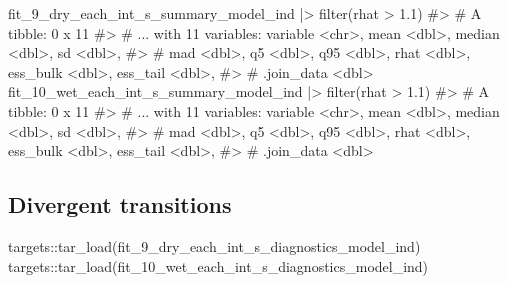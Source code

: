 \documentclass[
  11pt,
  letterpaper,
  DIV=11,
  numbers=noendperiod]{scrartcl}
\newenvironment{Shaded}{}{}
\newcommand{\CommentTok}[1]{\textcolor[rgb]{0.42,0.45,0.49}{#1}}
\newcommand{\FloatTok}[1]{\textcolor[rgb]{0.00,0.36,0.77}{#1}}
\newcommand{\FunctionTok}[1]{\textcolor[rgb]{0.44,0.26,0.76}{#1}}
\newcommand{\NormalTok}[1]{\textcolor[rgb]{0.14,0.16,0.18}{#1}}
\newcommand{\SpecialCharTok}[1]{\textcolor[rgb]{0.00,0.36,0.77}{#1}}
\begin{document}
\begin{Shaded}
\begin{Highlighting}[]
\NormalTok{fit\_9\_dry\_each\_int\_s\_summary\_model\_ind }\SpecialCharTok{|\textgreater{}} \FunctionTok{filter}\NormalTok{(rhat }\SpecialCharTok{\textgreater{}} \FloatTok{1.1}\NormalTok{)}
\CommentTok{\#\textgreater{} \# A tibble: 0 x 11}
\CommentTok{\#\textgreater{} \# ... with 11 variables: variable \textless{}chr\textgreater{}, mean \textless{}dbl\textgreater{}, median \textless{}dbl\textgreater{}, sd \textless{}dbl\textgreater{},}
\CommentTok{\#\textgreater{} \#   mad \textless{}dbl\textgreater{}, q5 \textless{}dbl\textgreater{}, q95 \textless{}dbl\textgreater{}, rhat \textless{}dbl\textgreater{}, ess\_bulk \textless{}dbl\textgreater{}, ess\_tail \textless{}dbl\textgreater{},}
\CommentTok{\#\textgreater{} \#   .join\_data \textless{}dbl\textgreater{}}
\NormalTok{fit\_10\_wet\_each\_int\_s\_summary\_model\_ind }\SpecialCharTok{|\textgreater{}} \FunctionTok{filter}\NormalTok{(rhat }\SpecialCharTok{\textgreater{}} \FloatTok{1.1}\NormalTok{)}
\CommentTok{\#\textgreater{} \# A tibble: 0 x 11}
\CommentTok{\#\textgreater{} \# ... with 11 variables: variable \textless{}chr\textgreater{}, mean \textless{}dbl\textgreater{}, median \textless{}dbl\textgreater{}, sd \textless{}dbl\textgreater{},}
\CommentTok{\#\textgreater{} \#   mad \textless{}dbl\textgreater{}, q5 \textless{}dbl\textgreater{}, q95 \textless{}dbl\textgreater{}, rhat \textless{}dbl\textgreater{}, ess\_bulk \textless{}dbl\textgreater{}, ess\_tail \textless{}dbl\textgreater{},}
\CommentTok{\#\textgreater{} \#   .join\_data \textless{}dbl\textgreater{}}
\end{Highlighting}
\end{Shaded}

\hypertarget{divergent-transitions}{%
\subsection{Divergent transitions}\label{divergent-transitions}}

\begin{Shaded}
\begin{Highlighting}[]
\NormalTok{targets}\SpecialCharTok{::}\FunctionTok{tar\_load}\NormalTok{(fit\_9\_dry\_each\_int\_s\_diagnostics\_model\_ind)}
\NormalTok{targets}\SpecialCharTok{::}\FunctionTok{tar\_load}\NormalTok{(fit\_10\_wet\_each\_int\_s\_diagnostics\_model\_ind)}
\end{Highlighting}
\end{Shaded}
\end{document}
